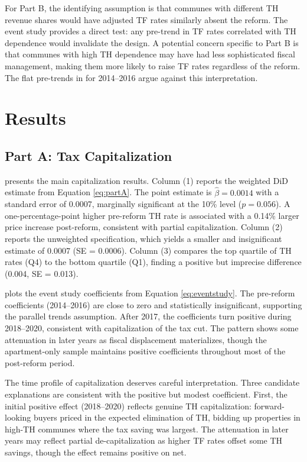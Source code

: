 \documentclass[12pt]{article}
\begin{document}
For Part B, the identifying assumption is that communes with different TH revenue shares would have adjusted TF rates similarly absent the reform. The event study provides a direct test: any pre-trend in TF rates correlated with TH dependence would invalidate the design. A potential concern specific to Part B is that communes with high TH dependence may have had less sophisticated fiscal management, making them more likely to raise TF rates regardless of the reform. The flat pre-trends in  for 2014--2016 argue against this interpretation.


\section{Results}

\subsection{Part A: Tax Capitalization}

 presents the main capitalization results. Column (1) reports the weighted DiD estimate from Equation \ref{eq:partA}. The point estimate is $\hat\beta = 0.0014$ with a standard error of 0.0007, marginally significant at the 10\% level ($p = 0.056$). A one-percentage-point higher pre-reform TH rate is associated with a 0.14\% larger price increase post-reform, consistent with partial capitalization. Column (2) reports the unweighted specification, which yields a smaller and insignificant estimate of 0.0007 (SE = 0.0006). Column (3) compares the top quartile of TH rates (Q4) to the bottom quartile (Q1), finding a positive but imprecise difference (0.004, SE = 0.013).



 plots the event study coefficients from Equation \ref{eq:eventstudy}. The pre-reform coefficients (2014--2016) are close to zero and statistically insignificant, supporting the parallel trends assumption. After 2017, the coefficients turn positive during 2018--2020, consistent with capitalization of the tax cut. The pattern shows some attenuation in later years as fiscal displacement materializes, though the apartment-only sample maintains positive coefficients throughout most of the post-reform period.

The time profile of capitalization deserves careful interpretation. Three candidate explanations are consistent with the positive but modest coefficient. First, the initial positive effect (2018--2020) reflects genuine TH capitalization: forward-looking buyers priced in the expected elimination of TH, bidding up properties in high-TH communes where the tax saving was largest. The attenuation in later years may reflect partial de-capitalization as higher TF rates offset some TH savings, though the effect remains positive on net.
\end{document}
